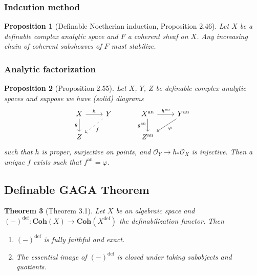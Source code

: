 \documentclass{amsart}
\newtheorem{theorem}{Theorem}[subsection]
\newtheorem{proposition}[theorem]{Proposition}
\theoremstyle{definition}
\numberwithin{equation}{section}
\newcommand{\definable}{\mathrm{def}}
\newcommand{\analytic}{\mathrm{an}}
\begin{document}
\subsubsection{Indcution method}
\begin{proposition}[Definable Noetherian induction, Proposition 2.46]
    Let $X$ be a definable complex analytic space and $F$ a coherent sheaf on $X$. 
    Any increasing chain of coherent subsheaves of $F$ must stabilize.
\end{proposition}

\subsubsection{Analytic factorization}
\begin{proposition}[Proposition 2.55]
    Let $X$, $Y$, $Z$ be definable complex analytic spaces and
    suppose we have (solid) diagrams
    \[
    \begin{tikzcd}
        X \ar[r,"h"] \ar[d,"g"'] & Y\ar[dl,"f",dotted] \\ Z 
    \end{tikzcd}
    \hspace*{30pt}
    \begin{tikzcd}
        X^{\analytic} \ar[r,"h^{\analytic}"] \ar[d,"g^{\analytic}"'] & Y^{\analytic}\ar[dl,"\varphi"] \\ Z^{\analytic} 
    \end{tikzcd}
    \]
    such that $h$ is proper, surjective on points,
    and $\mathcal{O}_Y \to h_*\mathcal{O}_X$ is injective.
    Then a unique $f$ exists such that $f^{\analytic} = \varphi$.
\end{proposition}

\subsection{Definable GAGA Theorem}

\begin{theorem}[Theorem 3.1]
    \label{def GAGA}
    Let $X$ be an algebraic space and 
    $(-)^{\definable} : \mathbf{Coh}(X) \to \mathbf{Coh}(X^{\definable})$ the definabilization functor.
    Then 
    \begin{enumerate}[label = {(\arabic*)}]
        \item $(-)^{\definable}$ is fully faithful and exact.
        \item The essential image of $(-)^{\definable}$ is closed under taking subobjects and quotients.
    \end{enumerate}
\end{theorem}
\end{document}
